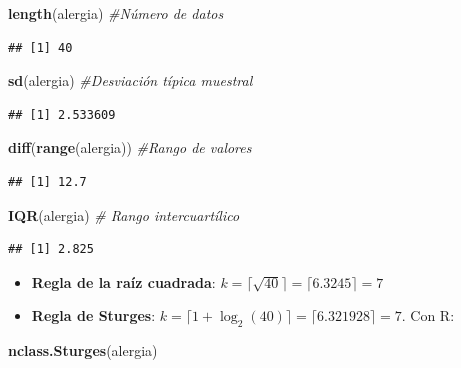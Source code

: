 \documentclass[]{book}
\newenvironment{Shaded}{\begin{snugshade}}{\end{snugshade}}
\newcommand{\CommentTok}[1]{\textcolor[rgb]{0.56,0.35,0.01}{\textit{#1}}}
\newcommand{\KeywordTok}[1]{\textcolor[rgb]{0.13,0.29,0.53}{\textbf{#1}}}
\newcommand{\NormalTok}[1]{#1}
\theoremstyle{definition}
\theoremstyle{definition}
\theoremstyle{definition}
\theoremstyle{remark}
\begin{document}
\begin{Shaded}
\begin{Highlighting}[]
\KeywordTok{length}\NormalTok{(alergia)  }\CommentTok{#Número de datos}
\end{Highlighting}
\end{Shaded}

\begin{verbatim}
## [1] 40
\end{verbatim}

\begin{Shaded}
\begin{Highlighting}[]
\KeywordTok{sd}\NormalTok{(alergia) }\CommentTok{#Desviación típica muestral}
\end{Highlighting}
\end{Shaded}

\begin{verbatim}
## [1] 2.533609
\end{verbatim}

\begin{Shaded}
\begin{Highlighting}[]
\KeywordTok{diff}\NormalTok{(}\KeywordTok{range}\NormalTok{(alergia))  }\CommentTok{#Rango de valores}
\end{Highlighting}
\end{Shaded}

\begin{verbatim}
## [1] 12.7
\end{verbatim}

\begin{Shaded}
\begin{Highlighting}[]
\KeywordTok{IQR}\NormalTok{(alergia) }\CommentTok{# Rango intercuartílico}
\end{Highlighting}
\end{Shaded}

\begin{verbatim}
## [1] 2.825
\end{verbatim}

\begin{itemize}
\item
  \textbf{Regla de la raíz cuadrada}: \(k= \lceil \sqrt{40} \rceil =\lceil 6.3245\rceil=7\)
\item
  \textbf{Regla de Sturges}: \(k= \lceil 1+\log_{2}(40)\rceil= \lceil 6.321928\rceil=7\). Con R:
\end{itemize}

\begin{Shaded}
\begin{Highlighting}[]
\KeywordTok{nclass.Sturges}\NormalTok{(alergia)}
\end{Highlighting}
\end{Shaded}
\end{document}
